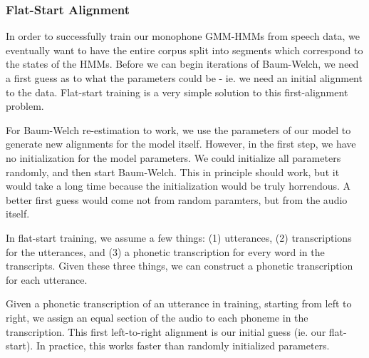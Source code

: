 \documentclass[10pt,a4paper]{article}
\begin{document}
\subsubsection*{Flat-Start Alignment}
  
In order to successfully train our monophone GMM-HMMs from speech data, we eventually want to have the entire corpus split into segments which correspond to the states of the HMMs. Before we can begin iterations of Baum-Welch, we need a first guess as to what the parameters could be - ie. we need an initial alignment to the data.  Flat-start training is a very simple solution to this first-alignment problem.


For Baum-Welch re-estimation to work, we use the parameters of our model to generate new alignments for the model itself. However, in the first step, we have no initialization for the model parameters. We could initialize all parameters randomly, and then start Baum-Welch. This in principle should work, but it would take a long time because the initialization would be truly horrendous. A better first guess would come not from random paramters, but from the audio itself.

In flat-start training, we assume a few things: (1) utterances, (2) transcriptions for the utterances, and (3) a phonetic transcription for every word in the transcripts. Given these three things, we can construct a phonetic transcription for each utterance.  

Given a phonetic transcription of an utterance in training, starting from left to right, we assign an equal section of the audio to each phoneme in the transcription. This first left-to-right alignment is our initial guess (ie. our flat-start). In practice, this works faster than randomly initialized parameters.

  
      
\end{document}
